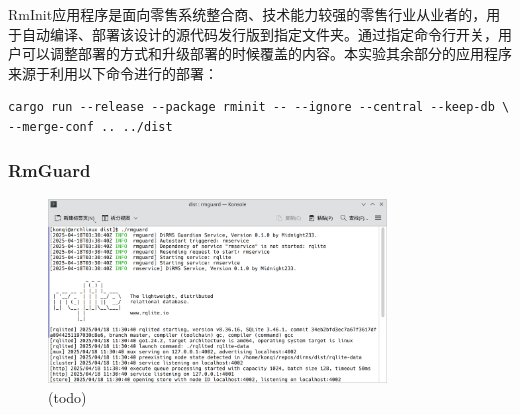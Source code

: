 RmInit应用程序是面向零售系统整合商、技术能力较强的零售行业从业者的，用于自动编译、部署该设计的源代码发行版到指定文件夹。通过指定命令行开关，用户可以调整部署的方式和升级部署的时候覆盖的内容。本实验其余部分的应用程序来源于利用以下命令进行的部署：

\begin{verbatim}
cargo run --release --package rminit -- --ignore --central --keep-db \
--merge-conf .. ../dist
\end{verbatim}

\subsubsection{RmGuard}

\begin{figure}[htbp]
	\centering
	\includegraphics[width=0.8\textwidth]{./exp/rmg-core.png}
	\caption{(todo)}
	\label{fig:rmg-core}
\end{figure}

